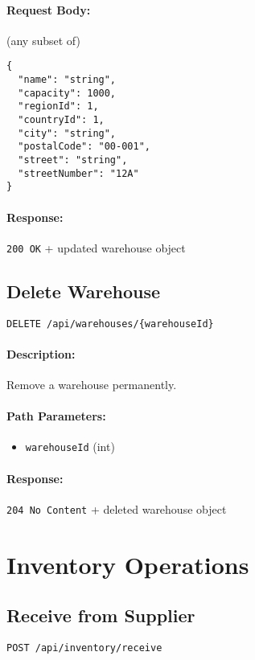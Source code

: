 \documentclass[a4paper,11pt]{article}
\begin{document}
\paragraph{Request Body:} (any subset of)
\begin{verbatim}
{
  "name": "string",
  "capacity": 1000,
  "regionId": 1,
  "countryId": 1,
  "city": "string",
  "postalCode": "00-001",
  "street": "string",
  "streetNumber": "12A"
}
\end{verbatim}
\paragraph{Response:} \texttt{200 OK} + updated warehouse object

\subsection{Delete Warehouse}
\label{sec:warehouses-delete}
\begin{verbatim}
DELETE /api/warehouses/{warehouseId}
\end{verbatim}
\paragraph{Description:} Remove a warehouse permanently.
\paragraph{Path Parameters:}
\begin{itemize}
  \item \texttt{warehouseId} (int)
\end{itemize}
\paragraph{Response:} \texttt{204 No Content} + deleted warehouse object

\section{Inventory Operations}
\label{sec:inventory}

\subsection{Receive from Supplier}
\label{sec:inventory-receive}
\begin{verbatim}
POST /api/inventory/receive
\end{verbatim}
\end{document}
